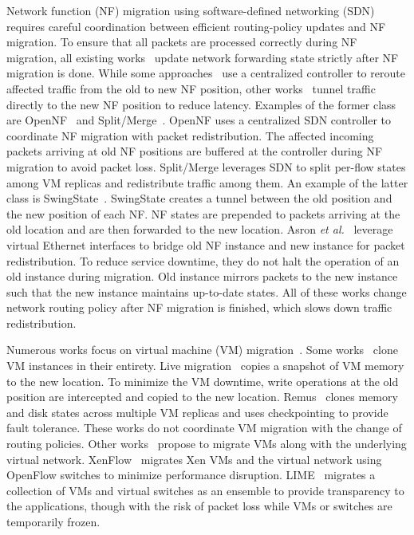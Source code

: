 Network function (NF) migration using software-defined networking
(SDN) requires careful coordination between efficient routing-policy updates and NF migration. To ensure that all packets
are processed correctly during NF migration, all existing
works~\cite{swingstate, opennf, split, transfer} update network
forwarding state strictly after NF migration is done.  While some
approaches~\cite{split, opennf} use a centralized controller to
reroute affected traffic from the old to new NF position, other
works~\cite{swingstate, transfer} tunnel traffic directly to the new
NF position to reduce latency. Examples of the former class are
OpenNF~\cite{opennf} and Split/Merge~\cite{split}. OpenNF uses a centralized SDN controller to
coordinate NF migration with packet redistribution. The affected
incoming packets arriving at old NF positions are buffered at the
controller during NF migration to avoid packet loss. Split/Merge leverages SDN to split per-flow states among 
VM replicas and redistribute traffic among them.
An example of the latter class is SwingState~\cite{swingstate}. SwingState creates a tunnel
between the old position and the new position of each NF. NF states are prepended
to packets arriving at the old location and are then forwarded to the new
location. Asron \textit{et al.}~\cite{transfer} leverage virtual Ethernet interfaces to bridge old NF instance and new instance for packet redistribution. To reduce service downtime, they do not halt the operation of an old instance during migration. Old instance mirrors packets to the new instance such that the new instance maintains up-to-date states.
All of these works change network routing policy after NF
migration is finished, which slows down traffic redistribution.


Numerous works focus on virtual machine (VM) migration~\cite{livevm,
  lime, Remus, Xenflow}. Some works~\cite{livevm, Remus} clone VM
instances in their entirety. Live migration~\cite{livevm} copies a
snapshot of VM memory to the new location. To minimize the VM
downtime, write operations at the old position are intercepted and
copied to the new location. Remus~\cite{Remus} clones memory and disk
states across multiple VM replicas and uses checkpointing to provide
fault tolerance. These works do not coordinate VM migration with the
change of routing policies.  Other works~\cite{lime, Xenflow} propose
to migrate VMs along with the underlying virtual network.
XenFlow~\cite{Xenflow} migrates Xen VMs and the virtual network using
OpenFlow switches to minimize performance disruption. LIME~\cite{lime}
migrates a collection of VMs and virtual switches as an ensemble to
provide transparency to the applications, though with the risk of
packet loss while VMs or switches are temporarily frozen.



